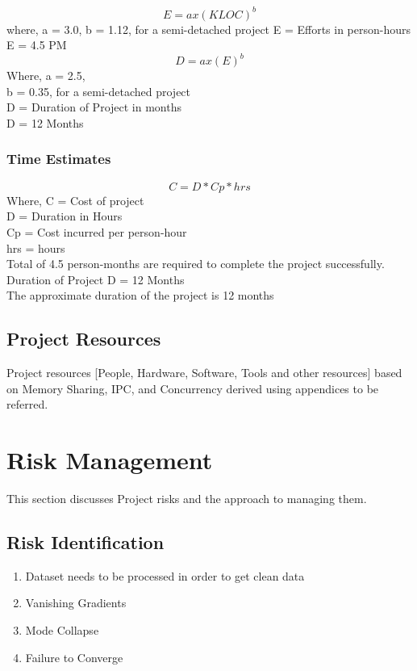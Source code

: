\documentclass[oneside,a4paper,12pt]{report}
\begin{document}
\[E=ax(KLOC)^b\]
\hspace*{0.25 in}where, a = 3.0, b = 1.12, for a semi-detached project
E = Efforts in person-hours\\
E = 4.5 PM\\
\[D=ax(E)^b\]
Where, a = 2.5,\\
b = 0.35, for a semi-detached project\\
D = Duration of Project in months\\
D = 12 Months\\

\subsubsection{Time Estimates}
\[C=D*Cp*hrs\]
Where, C = Cost of project\\
D = Duration in Hours\\
Cp = Cost incurred per person-hour\\
hrs = hours\\
Total of 4.5 person-months are required to complete the project successfully.\\
Duration of Project D = 12 Months\\
The approximate duration of the project is 12 months\\

\subsection{Project Resources}
          Project resources  [People, Hardware, Software, Tools and other resources] based on Memory Sharing, IPC, and Concurrency derived using appendices to be referred.

\section{Risk Management }
This section discusses Project risks and the approach to managing them.
\subsection{Risk Identification}
\begin{enumerate}
  \item Dataset needs to be processed in order to get clean data
  \item Vanishing Gradients
  \item Mode Collapse
  \item Failure to Converge
\end{enumerate}
\end{document}
